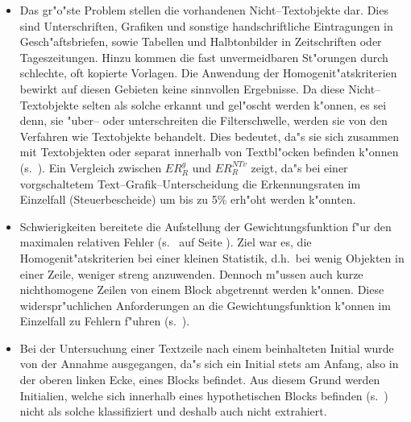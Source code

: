 \begin{itemize}
  \item  Das gr"o"ste Problem stellen die vorhandenen Nicht--Textobjekte dar.
  Dies sind Unterschriften, Grafiken und sonstige handschriftliche
  Eintragungen in Gesch"aftsbriefen, sowie Tabellen und Halbtonbilder in Zeitschriften oder
  Tageszeitungen. Hinzu kommen die fast unvermeidbaren St"orungen durch schlechte, oft kopierte
  Vorlagen. Die Anwendung der Homogenit"atskriterien bewirkt auf diesen Gebieten keine
  sinnvollen Ergebnisse. Da diese Nicht--Textobjekte selten als solche erkannt und gel"oscht 
  werden k"onnen, es sei denn, sie "uber-- oder unterschreiten die Filterschwelle, werden sie von den
  Verfahren wie Textobjekte behandelt. Dies bedeutet, da"s sie sich zusammen mit
  Textobjekten oder separat innerhalb von Textbl"ocken befinden k"onnen 
  (s.\ ). Ein Vergleich zwischen $ER_{R}^{g}$ und $ER_{R}^{NTv}$ zeigt, 
  da"s bei einer vorgschaltetem Text--Grafik--Unterscheidung die Erkennungsraten im Einzelfall
  (Steuerbescheide) um bis zu 5\% erh"oht werden k"onnten. 
   
  \item Schwierigkeiten bereitete die Aufstellung der Gewichtungsfunktion f"ur den maximalen 
  relativen Fehler (s.\  auf Seite \pageref{eps:ErrWeight}). Ziel war es,
  die Homogenit"atskriterien bei einer kleinen Statistik, d.h.\ bei wenig Objekten in einer Zeile,
  weniger streng anzuwenden. Dennoch m"ussen auch kurze nichthomogene Zeilen von einem
  Block abgetrennt werden k"onnen. Diese widerspr"uchlichen Anforderungen an die
  Gewichtungsfunktion k"onnen im Einzelfall zu Fehlern f"uhren (s.\ ).
  

  \item Bei der Untersuchung einer Textzeile nach einem beinhalteten Initial
  wurde von der Annahme ausgegangen, da"s sich ein Initial stets am
  Anfang, also in der oberen linken Ecke, eines Blocks befindet. Aus diesem Grund werden
  Initialien, welche sich innerhalb eines hypothetischen Blocks befinden 
  (s.\ ) nicht als solche klassifiziert und deshalb auch nicht extrahiert.
  
  

\end{itemize}
